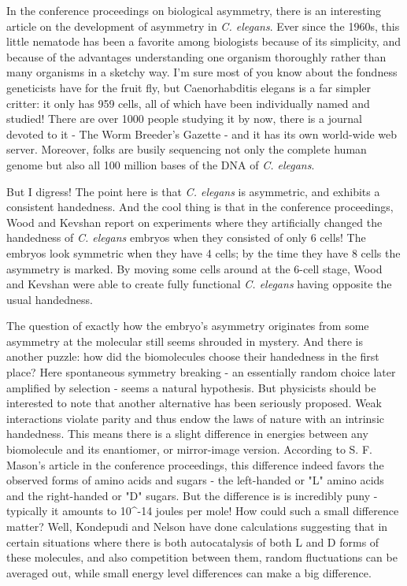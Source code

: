 In the conference proceedings on biological asymmetry, there is an
interesting article on the development of asymmetry in \emph{C. elegans}.  Ever
since the 1960s, this little nematode has been a favorite among
biologists because of its simplicity, and because of the advantages
understanding one organism thoroughly rather than many organisms in a
sketchy way.  I'm sure most of you know about the fondness geneticists
have for the fruit fly, but Caenorhabditis elegans is a far simpler
critter: it only has 959 cells, all of which have been individually
named and studied!  There are over 1000 people studying it by now, there
is a journal devoted to it - The Worm Breeder's Gazette - and it 
has its own world-wide web server.  Moreover, folks are busily
sequencing not only the complete human genome but also all 100 million
bases of the DNA of \emph{C. elegans}.  

But I digress!  The point here is that \emph{C. elegans} is asymmetric, and
exhibits a consistent handedness.  And the cool thing is that in the
conference proceedings, Wood and Kevshan report on experiments where
they artificially changed the handedness of \emph{C. elegans} embryos when they
consisted of only 6 cells!  The embryos look symmetric when they have 4
cells; by the time they have 8 cells the asymmetry is marked.  By moving
some cells around at the 6-cell stage, Wood and Kevshan were able to
create fully functional \emph{C. elegans} having opposite the usual handedness.

The question of exactly how the embryo's asymmetry originates from some
asymmetry at the molecular still seems shrouded in mystery.  And there
is another puzzle: how did the biomolecules choose their handedness in
the first place?  Here spontaneous symmetry breaking - an essentially
random choice later amplified by selection - seems a natural
hypothesis.  But physicists should be interested to note that another
alternative has been seriously proposed.  Weak interactions violate
parity and thus endow the laws of nature with an intrinsic handedness.  
This means there is a slight difference in energies between any
biomolecule and its enantiomer, or mirror-image version.  According to
S. F. Mason's article in the conference proceedings, this difference
indeed favors the observed forms of amino acids and sugars - the 
left-handed or "L" amino acids and the right-handed or 
"D" sugars.  
But the difference is is incredibly puny - typically it amounts to
10^{-14} joules per mole!  How could such a small difference matter?
Well, Kondepudi and Nelson have done calculations suggesting that in certain
situations where there is both autocatalysis of both L and D forms of
these molecules, and also competition between them, random fluctuations
can be averaged out, while small energy level differences can make a big
difference.  


